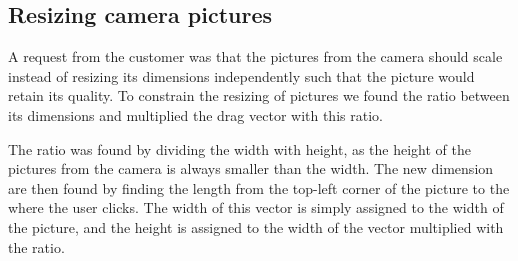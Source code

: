 \subsection{Resizing camera pictures}
A request from the customer was that the pictures from the camera should scale instead of resizing its dimensions independently such that the picture would retain its quality.
To constrain the resizing of pictures we found the ratio between its dimensions and multiplied the drag vector with this ratio.

The ratio was found by dividing the width with height, as the height of the pictures from the camera is always smaller than the width.
The new dimension are then found by finding the length from the top-left corner of the picture to the where the user clicks.
The width of this vector is simply assigned to the width of the picture, and the height is assigned to the width of the vector multiplied with the ratio.
